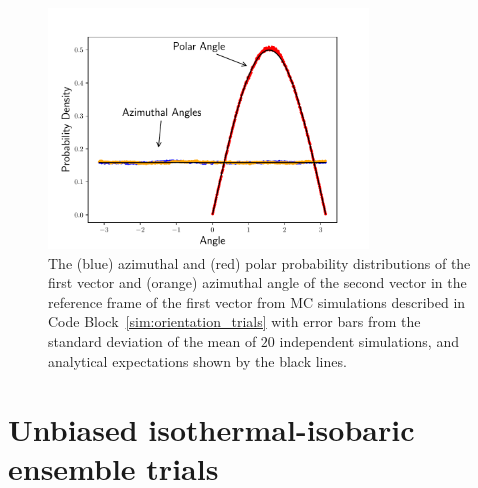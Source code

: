 \documentclass[
  9pt,
  bestpractices,
  pubversion,
]{livecoms}
\begin{document}
\begin{figure}
\begin{centering}
\includegraphics[width=8.5cm]{../figures/orientation_trials.pdf}
\caption{
  The (blue) azimuthal and (red) polar probability distributions of the first vector and (orange) azimuthal angle of the second vector in the reference frame of the first vector from MC simulations described in Code Block~\ref{sim:orientation_trials} with error bars from the standard deviation of the mean of $20$ independent simulations, and analytical expectations shown by the black lines.
\label{fig:orientation_trials}
}
\end{centering}
\end{figure}


\section{\label{sec:rhs_npt}Unbiased isothermal-isobaric ensemble trials}
\end{document}
